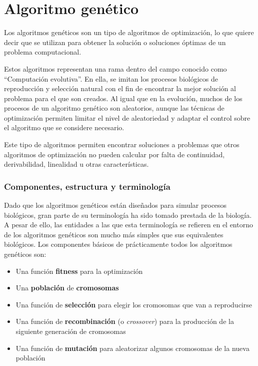 \chapter{Algoritmo genético}\label{ch:anexo2}
Los algoritmos genéticos son un tipo de algoritmos de optimización, lo que quiere decir que se utilizan para
obtener la solución o soluciones óptimas de un problema computacional\cite{JennaCarr}.

Estos algoritmos representan una rama dentro del campo conocido como ``Computación evolutiva''. En ella, se
imitan los procesos biológicos de reproducción y selección natural con el fin de encontrar la mejor solución al
problema para el que son creados. Al igual que en la evolución, muchos de los procesos de un algoritmo genético son
aleatorios, aunque las técnicas de optimización permiten limitar el nivel de aleatoriedad y adaptar el control sobre
el algoritmo que se considere necesario.

Este tipo de algoritmos permiten encontrar soluciones a problemas que otros algoritmos de optimización no pueden calcular
por falta de continuidad, derivabilidad, linealidad u otras características.

\subsection{Componentes, estructura y terminología}
Dado que los algoritmos genéticos están diseñados para simular procesos biológicos, gran parte de su terminología ha sido tomado
prestada de la biología. A pesar de ello, las entidades a las que esta terminología se refieren en el entorno de los algoritmos genéticos
son mucho más simples que sus equivalentes biológicos. Los componentes básicos de prácticamente todos los algoritmos genéticos son:

\begin{itemize}
	\item{Una función \textbf{fitness} para la optimización}
	\item{Una \textbf{población} de \textbf{cromosomas}}
	\item{Una función de \textbf{selección} para elegir los cromosomas que van a reproducirse}
	\item{Una función de \textbf{recombinación} (o \textit{crossover}) para la producción de la siguiente generación de cromosomas}
	\item{Una función de \textbf{mutación} para aleatorizar algunos cromosomas de la nueva población}
\end{itemize}

